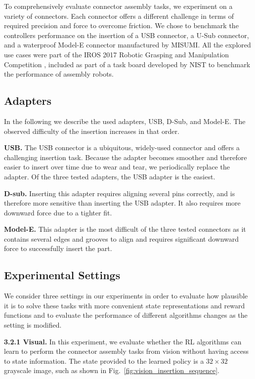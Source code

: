 To comprehensively evaluate connector assembly tasks, we experiment on a variety of connectors. Each connector offers a different challenge in terms of required precision and force to overcome friction. 
We chose to benchmark the controllers performance on the insertion of a USB connector, a U-Sub connector, and a waterproof Model-E connector manufactured by MISUMI.
All the explored use cases were part of the IROS 2017 Robotic Grasping and Manipulation Competition \cite{roboticgrasping2017iros}, included as part of a task board developed by NIST to benchmark the performance of assembly robots.

\subsection{Adapters}
In the following we describe the used adapters, USB, D-Sub, and Model-E. The observed difficulty of the insertion increases in that order.

\textbf{USB.} The USB connector is a ubiquitous, widely-used connector and offers a challenging insertion task. Because the adapter becomes smoother and therefore easier to insert over time due to wear and tear, we periodically replace the adapter. Of the three tested adapters, the USB adapter is the easiest.

\textbf{D-sub.} Inserting this adapter requires aligning several pins correctly, and is therefore more sensitive than inserting the USB adapter. It also requires more downward force due to a tighter fit.

\textbf{Model-E.} This adapter is the most difficult of the three tested connectors as it contains several edges and grooves to align and requires significant downward force to successfully insert the part.

\subsection{Experimental Settings}
We consider three settings in our experiments in order to evaluate how plausible it is to solve these tasks with more convenient state representations and reward functions and to evaluate the performance of different algorithms changes as the setting is modified.

\textbf{3.2.1 Visual. } In this experiment, we evaluate whether the RL algorithms can learn to perform the connector assembly tasks from vision without having access to state information. The state provided to the learned policy is a $32 \times 32$ grayscale image, such as shown in Fig.~\ref{fig:vision_insertion_sequence}.

